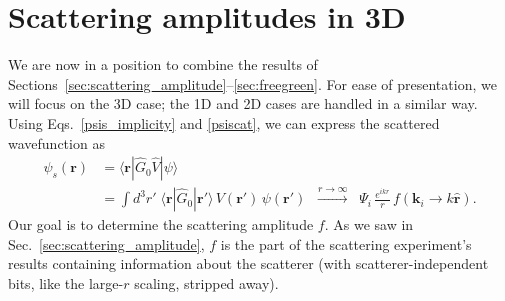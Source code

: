 \documentclass[pra,12pt]{revtex4-2}
\begin{document}

\section{Scattering amplitudes in 3D}
\label{sec:3damp}

We are now in a position to combine the results of
Sections~\ref{sec:scattering_amplitude}--\ref{sec:freegreen}.  For
ease of presentation, we will focus on the 3D case; the 1D and 2D
cases are handled in a similar way.  Using Eqs.~\eqref{psis_implicity}
and \eqref{psiscat}, we can express the scattered wavefunction as
\begin{align}
  \psi_s(\mathbf{r})
  &= \langle\mathbf{r}| \hat{G}_0 \hat{V} |\psi\rangle \\
  &= \int d^3r'\; \langle\mathbf{r}|\hat{G}_0|\mathbf{r}'\rangle\, V(\mathbf{r}')\, \psi(\mathbf{r}')
  \;\;\overset{r\rightarrow\infty}{\longrightarrow}\;\;
  \Psi_i \, \frac{e^{ikr}}{r} \, f(\mathbf{k}_i\rightarrow k\hat{\mathbf{r}}).
  \label{psis_expansion}
\end{align}
Our goal is to determine the scattering amplitude $f$.  As we saw in
Sec.~\ref{sec:scattering_amplitude}, $f$ is the part of the scattering
experiment's results containing information about the scatterer (with
scatterer-independent bits, like the large-$r$ scaling, stripped
away).
\end{document}
